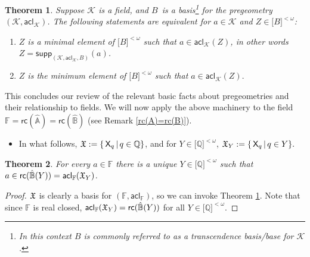 \documentclass{amsart}
\newtheorem{theorem}{Theorem}[section]
\newcommand{\mc}[1]{\mathcal #1}
\begin{document}
\begin{theorem} \label{support_in_field}Suppose $\mathcal{K}$ is a field, and $B$\ is a basis\footnote{
In this context $B$ is commonly referred to as a \textit{transcendence basis/base} for $\mathcal{K}$.} for the pregeometry  $(\mathcal{K},\mathsf{acl}_{\mathcal{K}})$.
The following statements are equivalent for $a\in \mc K$ and $Z\in  \lbrack B]^{<\omega }$:
\begin{enumerate}[$1$.]
   \item $Z$ is a  minimal element of $  \lbrack B]^{<\omega }$ such that $a\in \mathsf{acl}_{\mathcal{K}}(Z)$, in other words  
$Z=\mathsf{supp}_{(\mathcal{K},\mathsf{acl}_{\mathcal{K}},B)}(a)$. 

\item $Z$ is the minimum element of $ \lbrack B]^{<\omega }$ such that $a\in \mathsf{acl}_{\mathcal{K}}(Z).$
  

\end{enumerate}
\end{theorem}
This concludes our review of the relevant basic facts about pregeometries and
their relationship to fields. We will now apply the above machinery to the field 
$\mathbb{F}=\mathsf{rc}(\hat{\mathbb{A}})=\mathsf{rc}(\hat{\mathbb{B}})$ (see Remark \ref {rc(A)=rc(B)}).

\begin{itemize}
\item In
what follows, $\frak{X}:=\{\,\mathsf{X}_{q}\mathop\mid q\in \mathbb{Q}\}$,  and for 
$Y\in \lbrack \mathbb{Q}]^{<\omega }$, 
$\frak{X}_{Y}:=\{\,\mathsf{X}_{q}\mathop\mid q\in Y\}.$
\end{itemize}

\begin{theorem}\label{linking_thm}For every $a\in \mathbb{F}$ there is a unique $Y\in
\lbrack \mathbb{Q}]^{<\omega }$ such that $a\in \mathsf{rc}(\hat{\mathbb{B}}(Y))=\mathsf{acl}_{\mathbb{F}}(\frak{X}_{Y})$.
\end{theorem}

\begin{proof}$\frak{X}$ is clearly a basis for $(\mathbb{F},\mathsf{acl}_{\mathbb{F}})$, so we can invoke Theorem \ref{support_in_field}. 
Note that since $\mathbb{F}$ is real closed,  $\mathsf{acl}_{\mathbb{F}}(\frak{X}_{Y})=\mathsf{rc}(\hat{\mathbb{B}}(Y))$ for all 
$Y\in \lbrack \mathbb{Q}]^{<\omega }$.
\end{proof}
\end{document}
